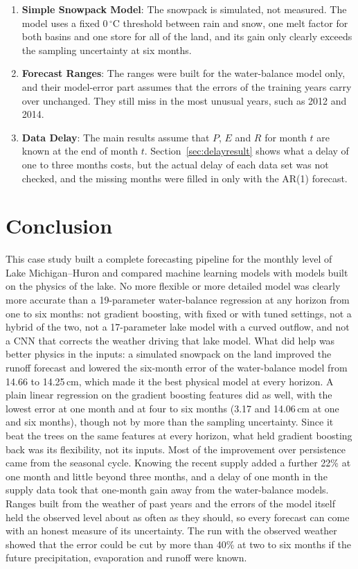 \documentclass{article}
\begin{document}
\begin{enumerate}
\item \textbf{Simple Snowpack Model}: The snowpack is simulated, not measured. The model uses a
fixed 0\,$^\circ$C threshold between rain and snow, one melt factor for both basins and one store
for all of the land, and its gain only clearly exceeds the sampling uncertainty at six months.
\item \textbf{Forecast Ranges}: The ranges were built for the water-balance model only, and their
model-error part assumes that the errors of the training years carry over unchanged. They still
miss in the most unusual years, such as 2012 and 2014.
\item \textbf{Data Delay}: The main results assume that $P$, $E$ and $R$ for month $t$ are known
at the end of month $t$. Section~\ref{sec:delayresult} shows what a delay of one to three months
costs, but the actual delay of each data set was not checked, and the missing months were filled
in only with the AR(1) forecast.
\end{enumerate}

\section{Conclusion}
\label{sec:conclusion}

This case study built a complete forecasting pipeline for the monthly level of Lake
Michigan--Huron and compared machine learning models with models built on the physics of the
lake. No more flexible or more detailed model was clearly more accurate than a 19-parameter
water-balance regression at any horizon from one to six months: not gradient boosting, with fixed
or with tuned settings, not a hybrid of the two, not a 17-parameter lake model with a curved
outflow, and not a CNN that corrects the weather driving that lake model. What did help was better
physics in the inputs: a simulated snowpack on the land improved the runoff forecast and lowered
the six-month error of the water-balance model from 14.66 to 14.25\,cm, which made it the best
physical model at every horizon. A plain linear regression on the gradient boosting features did
as well, with the lowest error at one month and at four to six months (3.17 and 14.06\,cm at one
and six months), though not by more than the sampling uncertainty. Since it beat the trees on the
same features at every horizon, what held gradient boosting back was its flexibility, not its
inputs. Most of the improvement over persistence came from the seasonal cycle. Knowing the recent
supply added a further 22\% at one month and little beyond three months, and a delay of one month
in the supply data took that one-month gain away from the water-balance models. Ranges built from
the weather of past years and the errors of the model itself held the observed level about as
often as they should, so every forecast can come with an honest measure of its uncertainty. The
run with the observed weather showed that the error could be cut by more than 40\% at two to six
months if the future precipitation, evaporation and runoff were known.
\end{document}
